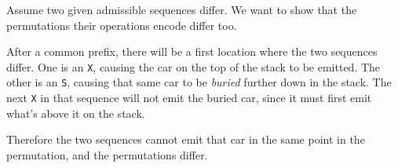 \documentclass{article}
\begin{document}
Assume two given admissible sequences differ. We want to show that the permutations their operations encode differ too.

After a common prefix, there will be a first location where the two sequences differ.
One is an \texttt{X}, causing the car on the top of the stack to be emitted.
The other is an \texttt{S}, causing that same car to be \textit{buried} further down in the stack.
The next \texttt{X} in that sequence will not emit the buried car, since it must first emit what's above it on the stack.

Therefore the two sequences cannot emit that car in the same point in the permutation, and the permutations differ.
\end{document}
